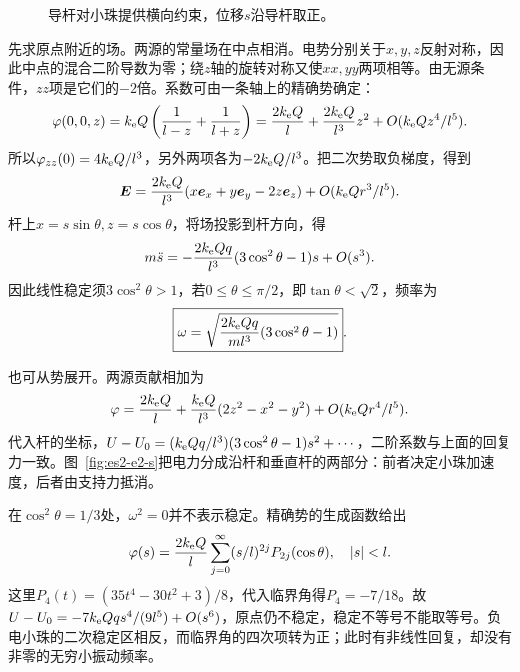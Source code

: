 \begin{figure}[H]\centering
{}
\caption{导杆对小珠提供横向约束，位移$s$沿导杆取正。}\label{fig:es2-e2-q}
\end{figure}
\begin{solution}
先求原点附近的场。两源的常量场在中点相消。电势分别关于$x,y,z$反射对称，因此中点的混合二阶导数为零；绕$z$轴的旋转对称又使$xx,yy$两项相等。由无源条件，$zz$项是它们的$-2$倍。系数可由一条轴上的精确势确定：
\[\varphi(0,0,z)=k_{\rm e} Q\left(\frac1{l-z}+\frac1{l+z}\right)
=\frac{2k_{\rm e} Q}{l}+\frac{2k_{\rm e} Q}{l^3}z^2+O(k_{\rm e} Qz^4/l^5).
\]
所以$\varphi_{zz}(0)=4k_{\rm e} Q/l^3$，另外两项各为$-2k_{\rm e} Q/l^3$。把二次势取负梯度，得到
\[\bm{E}=\frac{2k_{\rm e} Q}{l^3}(x\bm{e}_x+y\bm{e}_y-2z\bm{e}_z)+O(k_{\rm e} Qr^3/l^5).\]
杆上$x=s\sin\theta,z=s\cos\theta$，将场投影到杆方向，得
\[m\ddot s=-\frac{2k_{\rm e} Qq}{l^3}(3\cos^2\theta-1)s+O(s^3).
\]
因此线性稳定须$3\cos^2\theta>1$，若$0\le\theta\le\pi/2$，即$\tan\theta<\sqrt2$，频率为
\[\boxed{\omega=\sqrt{\frac{2k_{\rm e} Qq}{ml^3}(3\cos^2\theta-1)}}.\]

也可从势展开。两源贡献相加为
\[\varphi=\frac{2k_{\rm e} Q}{l}+\frac{k_{\rm e} Q}{l^3}(2z^2-x^2-y^2)+O(k_{\rm e} Qr^4/l^5).
\]
代入杆的坐标，$U-U_0=(k_{\rm e} Qq/l^3)(3\cos^2\theta-1)s^2+\cdots$，二阶系数与上面的回复力一致。图~\ref{fig:es2-e2-s}把电力分成沿杆和垂直杆的两部分：前者决定小珠加速度，后者由支持力抵消。

在$\cos^2\theta=1/3$处，$\omega^2=0$并不表示稳定。精确势的生成函数给出
\[\varphi(s)=\frac{2k_{\rm e} Q}{l}\sum_{j=0}^\infty(s/l)^{2j}P_{2j}(\cos\theta),\quad |s|<l.
\]
这里$P_4(t)=(35t^4-30t^2+3)/8$，代入临界角得$P_4=-7/18$。故$U-U_0=-7k_{\rm e} Qq s^4/(9l^5)+O(s^6)$，原点仍不稳定，稳定不等号不能取等号。负电小珠的二次稳定区相反，而临界角的四次项转为正；此时有非线性回复，却没有非零的无穷小振动频率。
\begin{figure}[H]\centering
{}
\end{figure}
\end{solution}
